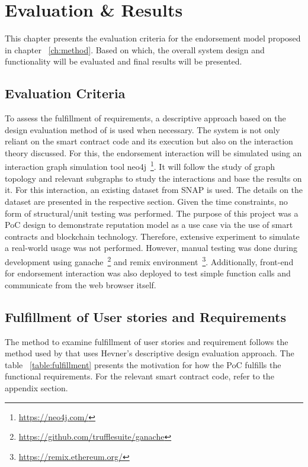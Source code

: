 \chapter{Evaluation \& Results} \label{ch:results}
This chapter presents the evaluation criteria for the endorsement model
proposed in chapter ~\ref{ch:method}. Based on which, the overall system design
and functionality will be evaluated and final results will be presented. 

\section{Evaluation Criteria}
To assess the fulfillment of requirements, a descriptive approach
based on the design evaluation method of \cite{hevner2010design} is used when
necessary. The system is not only reliant on the smart contract code and its
execution but also on the interaction theory discussed. For this, the
endorsement interaction will be simulated using an interaction graph simulation
tool neo4j~\footnote{\url{https://neo4j.com/}}. It will follow the study of graph topology and relevant subgraphs
to study the interactions and base the results on it. For this interaction, an
existing dataset from SNAP\cite{snapnets} is used. The details on the dataset
are presented in the respective section.  Given the time constraints, no form
of structural/unit testing was performed. The purpose of this project was a PoC
design to demonstrate reputation model as a use case via the use of smart
contracts and blockchain technology. Therefore, extensive experiment to
simulate a real-world usage was not performed. However, manual testing was done
during development using
ganache~\footnote{\url{https://github.com/trufflesuite/ganache}} and remix
environment~\footnote{\url{https://remix.ethereum.org/}}. Additionally, front-end for
endorsement interaction was also deployed to test simple function calls and
communicate from the web browser itself. 

\section{Fulfillment of User stories and Requirements}
The method to examine fulfillment of user stories and requirement follows the
method used by \cite{Bergquist1107612} that uses Hevner's descriptive design
evaluation approach\cite{hevner2010design}. The table ~\ref{table:fulfillment}
presents the motivation for how the PoC fulfills the functional requirements. 
For the relevant smart contract code, refer to the appendix section. \\ 


